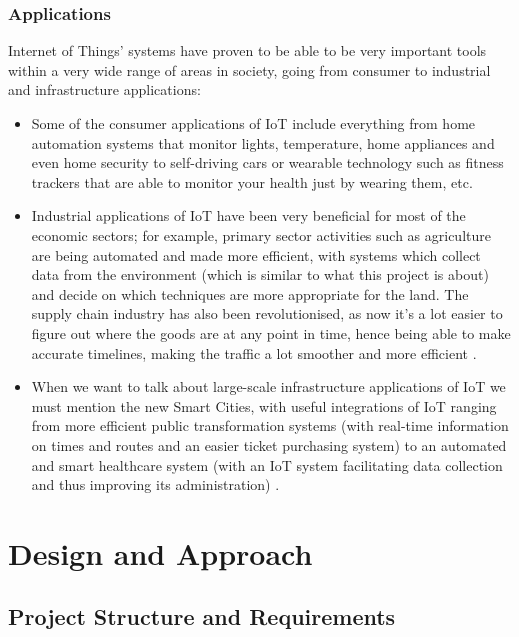 \documentclass[12pt]{article}
\begin{document}
\subsubsection{Applications}

Internet of Things' systems have proven to be able to be very important tools within a very wide range of areas in society, going from consumer to industrial and infrastructure applications:

\begin{itemize}
    \item Some of the consumer applications of IoT include everything from home automation systems that monitor lights, temperature, home appliances and even home security to self-driving cars or wearable technology such as fitness trackers that are able to monitor your health just by wearing them, etc.
    \item Industrial applications of IoT have been very beneficial for most of the economic sectors; for example, primary sector activities such as agriculture are being automated and made more efficient, with systems which collect data from the environment (which is similar to what this project is about) and decide on which techniques are more appropriate for the land. The supply chain industry has also been revolutionised, as now it's a lot easier to figure out where the goods are at any point in time, hence being able to make accurate timelines, making the traffic a lot smoother and more efficient \cite{blume}. 
    \item When we want to talk about large-scale infrastructure applications of IoT we must mention the new Smart Cities, with useful integrations of IoT ranging from more efficient public transformation systems (with real-time information on times and routes and an easier ticket purchasing system) to an automated and smart healthcare system (with an IoT system facilitating data collection and thus improving its administration) \cite{chathuranga}.
\end{itemize}

\section{Design and Approach}

\subsection{Project Structure and Requirements}
\end{document}
